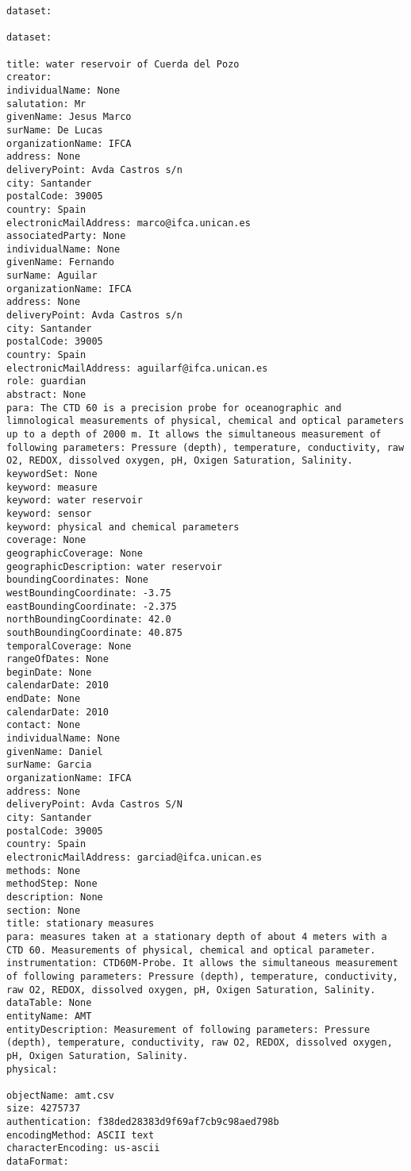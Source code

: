 \documentclass[11pt]{article}
\begin{document}
    \begin{Verbatim}[commandchars=\\\{\}]
dataset:  

dataset:  

title: water reservoir of Cuerda del Pozo
creator:  
individualName: None
salutation: Mr
givenName: Jesus Marco
surName: De Lucas
organizationName: IFCA
address: None
deliveryPoint: Avda Castros s/n
city: Santander
postalCode: 39005
country: Spain
electronicMailAddress: marco@ifca.unican.es
associatedParty: None
individualName: None
givenName: Fernando
surName: Aguilar
organizationName: IFCA
address: None
deliveryPoint: Avda Castros s/n
city: Santander
postalCode: 39005
country: Spain
electronicMailAddress: aguilarf@ifca.unican.es
role: guardian
abstract: None
para: The CTD 60 is a precision probe for oceanographic and limnological measurements of physical, chemical and optical parameters up to a depth of 2000 m. It allows the simultaneous measurement of following parameters: Pressure (depth), temperature, conductivity, raw O2, REDOX, dissolved oxygen, pH, Oxigen Saturation, Salinity.
keywordSet: None
keyword: measure
keyword: water reservoir
keyword: sensor
keyword: physical and chemical parameters
coverage: None
geographicCoverage: None
geographicDescription: water reservoir
boundingCoordinates: None
westBoundingCoordinate: -3.75
eastBoundingCoordinate: -2.375
northBoundingCoordinate: 42.0
southBoundingCoordinate: 40.875
temporalCoverage: None
rangeOfDates: None
beginDate: None
calendarDate: 2010
endDate: None
calendarDate: 2010
contact: None
individualName: None
givenName: Daniel
surName: Garcia
organizationName: IFCA
address: None
deliveryPoint: Avda Castros S/N
city: Santander
postalCode: 39005
country: Spain
electronicMailAddress: garciad@ifca.unican.es
methods: None
methodStep: None
description: None
section: None
title: stationary measures
para: measures taken at a stationary depth of about 4 meters with a CTD 60. Measurements of physical, chemical and optical parameter.
instrumentation: CTD60M-Probe. It allows the simultaneous measurement of following parameters: Pressure (depth), temperature, conductivity, raw O2, REDOX, dissolved oxygen, pH, Oxigen Saturation, Salinity.
dataTable: None
entityName: AMT
entityDescription: Measurement of following parameters: Pressure (depth), temperature, conductivity, raw O2, REDOX, dissolved oxygen, pH, Oxigen Saturation, Salinity.
physical: 

objectName: amt.csv
size: 4275737
authentication: f38ded28383d9f69af7cb9c98aed798b
encodingMethod: ASCII text
characterEncoding: us-ascii
dataFormat:  


\end{Verbatim}
\end{document}
